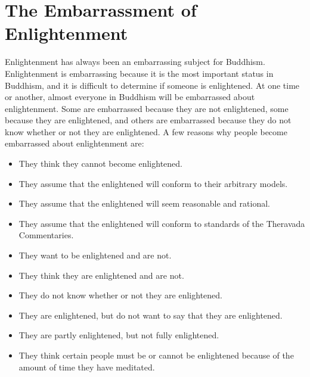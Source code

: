 \documentclass[a5paper,10pt,english]{book}
\begin{document}
\section{The Embarrassment of Enlightenment}
\label{\detokenize{saints:the-embarrassment-of-enlightenment}}
\sphinxAtStartPar
Enlightenment has always been an embarrassing subject for Buddhism.
Enlightenment is embarrassing because it is the most important status in
Buddhism, and it is difficult to determine if someone is enlightened. At
one time or another, almost everyone in Buddhism will be embarrassed
about enlightenment. Some are embarrassed because they are not
enlightened, some because they are enlightened, and others are
embarrassed because they do not know whether or not they are
enlightened. A few reasons why people become embarrassed about
enlightenment are:
\begin{itemize}
\item {} 
\sphinxAtStartPar
They think they cannot become enlightened.

\item {} 
\sphinxAtStartPar
They assume that the enlightened will conform to their arbitrary
models.

\item {} 
\sphinxAtStartPar
They assume that the enlightened will seem reasonable and rational.

\item {} 
\sphinxAtStartPar
They assume that the enlightened will conform to standards of the
Theravada Commentaries.

\item {} 
\sphinxAtStartPar
They want to be enlightened and are not.

\item {} 
\sphinxAtStartPar
They think they are enlightened and are not.

\item {} 
\sphinxAtStartPar
They do not know whether or not they are enlightened.

\item {} 
\sphinxAtStartPar
They are enlightened, but do not want to say that they are
enlightened.

\item {} 
\sphinxAtStartPar
They are partly enlightened, but not fully enlightened.

\item {} 
\sphinxAtStartPar
They think certain people must be or cannot be enlightened because of
the amount of time they have meditated.

\end{itemize}
\end{document}
